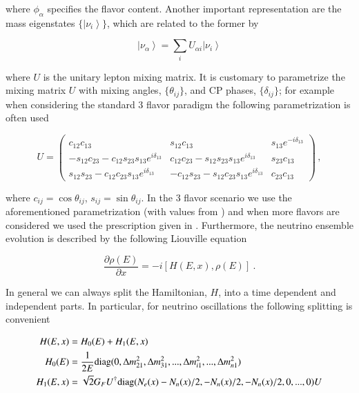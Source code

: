 \documentclass[3p,12pt,authoryear]{elsarticle}
\newcommand{\ket}[1]{\ensuremath{\left|#1\right\rangle}}
\newcommand{\pa}[2]{\frac{\partial #1}{\partial #2}}
\begin{document}
where $\phi_\alpha$ specifies the flavor content. Another important representation are the mass eigenstates $\{ \ket{\nu_i}  \}$, which are related to the former by

\begin{equation}
\ket{\nu_\alpha} = \sum_i U_{\alpha i} \ket{\nu_i} 
\label{eq:changebasis}
\end{equation}

where $U$ is the unitary lepton mixing matrix. It is customary to parametrize the mixing matrix $U$ with mixing angles, $\{\theta_{ij}\}$, and CP phases, $\{ \delta_{ij} \}$; for example when considering the standard 3 flavor paradigm the following parametrization is often used

\begin{equation}
U
=
\begin{pmatrix}
c_{12} c_{13} & s_{12} c_{13} & s_{13} e^{-i\delta_{13}} \\ 
- s_{12} c_{23} - c_{12} s_{23} s_{13} e^{i\delta_{13}} & c_{12} c_{23} - s_{12} s_{23} s_{13} e^{i\delta_{13}} & s_{23} c_{13} \\
s_{12}s_{23} -c_{12}c_{23}s_{13}e^{i\delta_{13}} & - c_{12} s_{23} - s_{12} c_{23} s_{13} e^{i\delta_{13}} & c_{23} c_{13}
\end{pmatrix}
\,,
\label{eq:U}
\end{equation}

where $c_{ij} = \cos \theta_{ij}$, $s_{ij} = \sin \theta_{ij}$. In the 3 flavor scenario we use the aforementioned parametrization (with values from \citep{gonzalez2012global}) and when more flavors are considered we used the prescription given in \citet{SQUIDS}. Furthermore, the neutrino ensemble evolution is described by the following Liouville equation

\begin{equation}
\pa{\rho(E)}{x} = -i [ H (E,x), \rho(E) ]~.
\label{eq:schrodinger}
\end{equation}

In general we can always split the Hamiltonian, $H$, into a time dependent and independent parts. In particular, for neutrino oscillations the following splitting is convenient

\begin{subequations}
\label{eq:hamiltonian}
\begin{align}
H(E,x) &= H_0(E)  + H_{1}(E,x) \\
H_0 (E) &= \frac{1}{2E} {\rm diag}( 0 , \Delta m^2_{21},\Delta m^2_{31},...,\Delta m^2_{i1},...,\Delta m^2_{n1}) \label{eq:h0} \\
H_1 (E,x) &= \sqrt{2} G_F U^\dagger {\rm diag} ( N_e(x) - N_n(x)/2, -N_n(x)/2, -N_n(x)/2 , 0,...,0 )U\label{eq:hi} 
\end{align}
\end{subequations}
\end{document}
